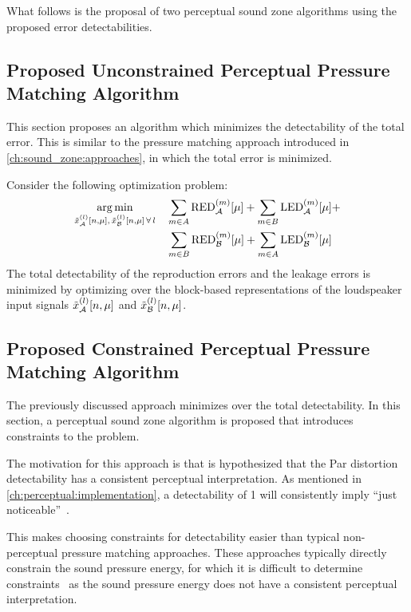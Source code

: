 What follows is the proposal of two perceptual sound zone algorithms using the proposed error detectabilities.

\subsection{Proposed Unconstrained Perceptual Pressure Matching Algorithm}
\label{ch:perceptual_sound_zone:perceptual_minimization:unconstrained}
This section proposes an algorithm which minimizes the detectability of the total error.
This is similar to the pressure matching approach introduced in \autoref{ch:sound_zone:approaches}, 
in which the total error is minimized.

Consider the following optimization problem:
\begin{equation}
    \begin{aligned}
    \argmin{\tilde{x}_\za^{(l)}[n,\mu],\,\tilde{x}_\zb^{(l)}[n,\mu]\,\forall\,l}{
       & \sum_{m\in A}\text{RED}_\za^{(m)}[\mu] + \sum_{m\in B}\text{LED}_\za^{(m)}[\mu] +\\
       & \sum_{m\in B}\text{RED}_\zb^{(m)}[\mu] + \sum_{m\in A}\text{LED}_\zb^{(m)}[\mu]
    }
    \end{aligned}
    \label{eq:perceptual_unconstrained}
\end{equation}
The total detectability of the reproduction errors and the leakage errors is minimized by optimizing over the 
block-based representations of the loudspeaker input signals $\tilde{x}_{\mathcal{A}}^{(l)}[n,\mu]$ and $\tilde{x}_{\mathcal{B}}^{(l)}[n,\mu]$.

\subsection{Proposed Constrained Perceptual Pressure Matching Algorithm}
\label{ch:perceptual_sound_zone:perceptual_minimization:constrained}
The previously discussed approach minimizes over the total detectability.
In this section, a perceptual sound zone algorithm is proposed that introduces constraints to the problem. 

The motivation for this approach is that is hypothesized that the Par distortion detectability has a consistent perceptual interpretation.
As mentioned in \autoref{ch:perceptual:implementation}, a detectability of 1 will consistently imply ``just noticeable''~\cite{van2005perceptual}.

This makes choosing constraints for detectability easier than typical non-perceptual pressure matching approaches.
These approaches typically directly constrain the sound pressure energy,
for which it is difficult to determine constraints~\cite{shi2021generation} as the sound pressure energy does not have a consistent perceptual interpretation.

